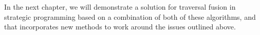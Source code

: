 In the next chapter, we will demonstrate a solution for traversal fusion in strategic programming based on a combination of both of these algorithms, and that incorporates new methods to work around the issues outlined above.


